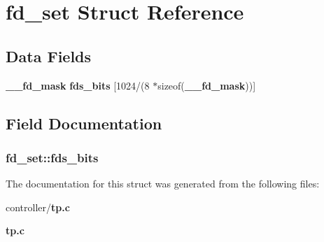 \section{fd\_\-set Struct Reference}
\label{structfd__set}
\subsection*{Data Fields}
\begin{DoxyCompactItemize}
\item 
{\bf \_\-\_\-fd\_\-mask} {\bf fds\_\-bits} [1024/(8 $\ast$sizeof({\bf \_\-\_\-fd\_\-mask}))]
\end{DoxyCompactItemize}


\subsection{Field Documentation}
\subsubsection[{fds\_\-bits}]{ {\bf fd\_\-set::fds\_\-bits}}\label{structfd__set_a512161b46afe9ab46e6b59034313a727}


The documentation for this struct was generated from the following files:\begin{DoxyCompactItemize}
\item 
controller/{\bf tp.c}\item 
{\bf tp.c}\end{DoxyCompactItemize}
